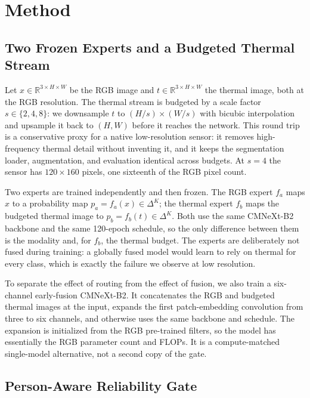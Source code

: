 \section{Method}

\subsection{Two Frozen Experts and a Budgeted Thermal Stream}

Let $x\in\mathbb{R}^{3\times H\times W}$ be the RGB image and $t\in\mathbb{R}^{3\times
H\times W}$ the thermal image, both at the RGB resolution. The thermal stream is
budgeted by a scale factor $s\in\{2,4,8\}$: we downsample $t$ to $(H/s)\times(W/s)$
with bicubic interpolation and upsample it back to $(H,W)$ before it reaches the
network. This round trip is a conservative proxy for a native low-resolution sensor:
it removes high-frequency thermal detail without inventing it, and it keeps the
segmentation loader, augmentation, and evaluation identical across budgets. At
$s=4$ the sensor has $120\times160$ pixels, one sixteenth of the RGB pixel count.

Two experts are trained independently and then frozen. The RGB expert $f_a$ maps $x$
to a probability map $p_a=f_a(x)\in\Delta^{K}$; the thermal expert $f_b$ maps the
budgeted thermal image to $p_b=f_b(t)\in\Delta^{K}$. Both use the same CMNeXt-B2
backbone and the same 120-epoch schedule, so the only difference between them is the
modality and, for $f_b$, the thermal budget. The experts are deliberately not fused
during training: a globally fused model would learn to rely on thermal for every class,
which is exactly the failure we observe at low resolution.

To separate the effect of routing from the effect of fusion, we also train a
six-channel early-fusion CMNeXt-B2. It concatenates the RGB and budgeted thermal images
at the input, expands the first patch-embedding convolution from three to six channels,
and otherwise uses the same backbone and schedule. The expansion is initialized from the
RGB pre-trained filters, so the model has essentially the RGB parameter count and FLOPs. It
is a compute-matched single-model alternative, not a second copy of the gate.

\subsection{Person-Aware Reliability Gate}

